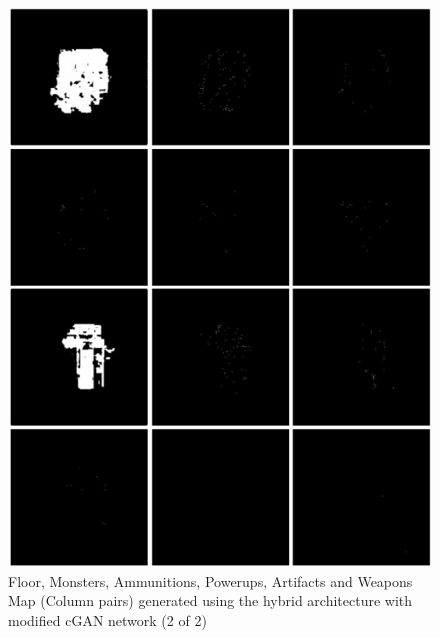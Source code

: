 \documentclass{Configuration_Files/PoliMi3i_thesis}
\begin{document}
\begin{figure}[H]
    \centering
    \includegraphics[width=1\textwidth]{mod_cgan_sample2.jpg}
    \caption[Samples generated using the modified cGAN network (2 of 2)]{Floor, Monsters, Ammunitions, Powerups, Artifacts and Weapons Map 
(Column pairs) generated using the hybrid architecture with modified cGAN network (2 of 2)}
    \label{fig:modcgansample1}
\end{figure}
\end{document}
